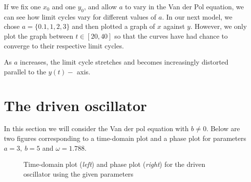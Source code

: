 \documentclass[11pt,a4paper]{amsart}
\begin{document}
If we fix one $x_0$ and one $y_0$, and allow $a$ to vary in the Van der Pol equation, we can see how limit cycles vary for different values of $a$. In our next model, we chose $a=\{0.1,1,2,3\}$ and then plotted a graph of $x$ against $y$. However, we only plot the graph between $t\in[20,40]$ so that the curves have had chance to converge to their respective limit cycles.

As $a$ increases, the limit cycle stretches and becomes increasingly distorted parallel to the ${y(t)-}$ axis.

\section*{The driven oscillator}
In this section we will consider the Van der pol equation with $b\neq0$. Below are two figures corresponding to a time-domain plot and a phase plot for parameters $a=3,\ b=5$ and $\omega=1.788$.

\begin{figure}[h]
\caption{Time-domain plot (\textit{left}) and phase plot (\textit{right}) for the driven oscillator using the given parameters}
\centering
{}
	\hfill
{}
\end{figure}
\end{document}
